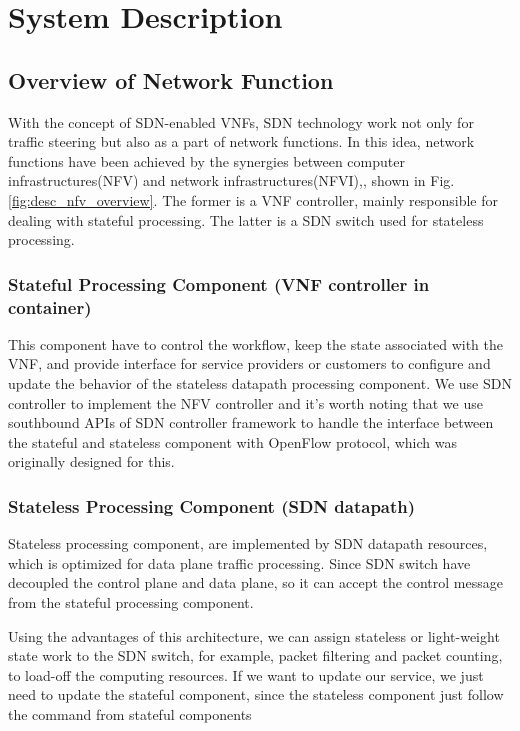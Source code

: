 \documentclass[journal]{IEEEtran}
\begin{document}
\section{System Description}
\subsection{Overview of Network Function}\label{ssec:desc_nfv_overview}
With the concept of SDN-enabled VNFs\cite{sdn-enabled}\cite{manage-nve}, SDN technology work not only for traffic steering but also as a part of network functions. In this idea, network functions have been achieved by the synergies between computer infrastructures(NFV) and network infrastructures(NFVI)\cite{nfv2014-v121},\cite{nfv2015}, shown in Fig. \ref{fig:desc_nfv_overview}. The former is a VNF controller, mainly responsible for dealing with stateful processing. The latter is a SDN switch used for stateless processing.

\subsubsection{Stateful Processing Component (VNF controller in container)}
This component have to control the workflow, keep the state associated with the VNF, and provide interface for service providers or customers to configure and update the behavior of the stateless datapath processing component. We use SDN controller to implement the NFV controller and it’s worth noting that we use southbound APIs of SDN controller framework to handle the interface between the stateful and stateless component with OpenFlow protocol, which was originally designed for this.

\subsubsection{Stateless Processing Component (SDN datapath)}
Stateless processing component, are implemented by SDN datapath resources, which is optimized for data plane traffic processing. Since SDN switch have decoupled the control plane and data plane, so it can accept the control message from the stateful processing component.

Using the advantages of this architecture, we can assign stateless or light-weight state work to the SDN switch, for example, packet filtering and packet counting, to load-off the computing resources. If we want to update our service, we just need to update the stateful component, since the stateless component just follow the command from stateful components
\end{document}
